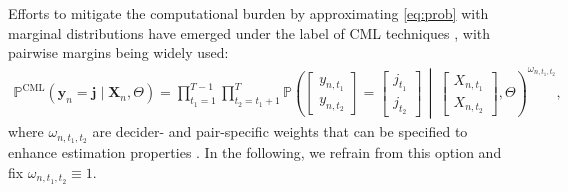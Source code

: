 \documentclass[preprint,12pt,authoryear]{elsarticle}
\renewcommand{\Pr}{\mathbb{P}}
\begin{document}
Efforts to mitigate the computational burden by approximating \eqref{eq:prob} with marginal distributions have emerged under the label of CML techniques \citep{Varin2008}, with pairwise margins being widely used:
%
\begin{align}
   \label{eq:cml}
   \Pr^\text{CML} \left( \bm{y}_n = \bm{j} \mid \bm{X}_n, \Theta \right) = \prod_{t_1 = 1}^{T - 1} \prod_{t_2 = t_1 + 1}^T \Pr \left( \begin{bmatrix} y_{n,t_1} \\ y_{n,t_2} \end{bmatrix} = \begin{bmatrix} j_{t_1} \\ j_{t_2} \end{bmatrix} \,\middle\vert\, \begin{bmatrix} X_{n,t_1} \\ X_{n,t_2} \end{bmatrix}, \Theta \right)^{\omega_{n,t_1,t_2}},
\end{align}
%
where $\omega_{n,t_1,t_2}$ are decider- and pair-specific weights that can be specified to enhance estimation properties \citep{Buescher2024}. In the following, we refrain from this option and fix $\omega_{n,t_1,t_2} \equiv 1$.
\end{document}

